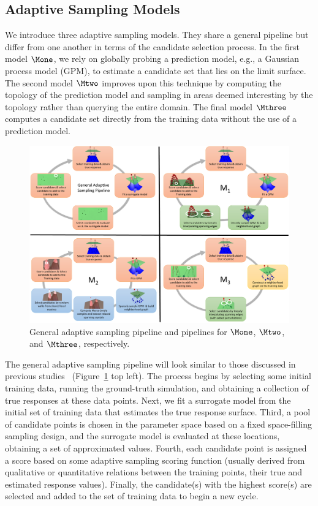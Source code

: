 \subsection{Adaptive Sampling Models}
\label{sec:pipelines}

We introduce three adaptive sampling models.
%
They share a general pipeline but differ from one another in terms of the candidate selection process.
%
In the first model $\Mone$, we rely on globally probing a prediction model, e.g., a Gaussian process model (GPM), to estimate a candidate set that lies on the limit surface.
%
The second model $\Mtwo$ improves upon this technique by computing the topology of the prediction model and sampling in areas deemed interesting by the topology rather than querying the entire domain.
%
The final model $\Mthree$ computes a candidate set directly from the training data without the use of a prediction model.

\begin{figure}[!ht]
\centering
\includegraphics[width=1.0\textwidth]{figs/chap5/pipelines}
\caption{General adaptive sampling pipeline and pipelines for $\protect\Mone$, $\protect\Mtwo$, and $\protect\Mthree$, respectively.}
\label{fig:pipelines}
\end{figure}

The general adaptive sampling pipeline will look similar to those discussed in previous studies~\cite{MaljovecWangKupresanin2013} (Figure~\ref{fig:pipelines} top left).
%
The process begins by selecting some initial training data, running the ground-truth simulation, and obtaining a collection of true responses at these data points.
%
Next, we fit a surrogate model from the initial set of training data that estimates the true response surface.
%
Third, a pool of candidate points is chosen in the parameter space based on a fixed space-filling sampling design, and the surrogate model is evaluated at these locations, obtaining a set of approximated values.
%
Fourth, each candidate point is assigned a score based on some adaptive sampling scoring function (usually derived from qualitative or quantitative relations between the training points, their true and estimated response values).
%
Finally, the candidate(s) with the highest score(s) are selected and added to the set of training data to begin a new cycle.

